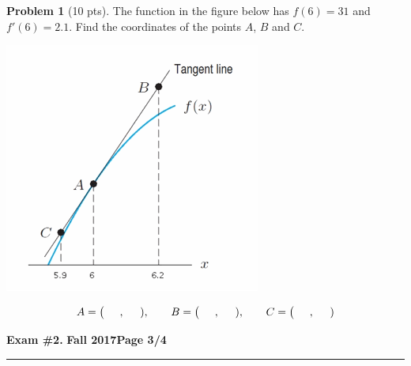 \documentclass[12pt]{article}
\theoremstyle{definition}
\newtheorem{problem}{Problem}
\begin{document}
\begin{problem}[10 pts]
The function in the figure below has $f(6)=31$ and $f'(6)=2.1$. Find the coordinates of the points $A$, $B$ and $C$.
\begin{center}
\includegraphics[width=0.5\linewidth]{2graph.png}
\end{center}
\begin{equation*}
A = \big( \hspace{0.5cm}, \hspace{0.5cm} ), \qquad B = \big( \hspace{0.5cm}, \hspace{0.5cm} ), \qquad C = \big( \hspace{0.5cm}, \hspace{0.5cm})
\end{equation*}
\end{problem}


\newpage

\hfill{\large\bf Exam \#2.}\hfill{\large\bf
  Fall 2017}\hfill{\large\bf Page 3/4}\hrule

\bigskip
\end{document}

